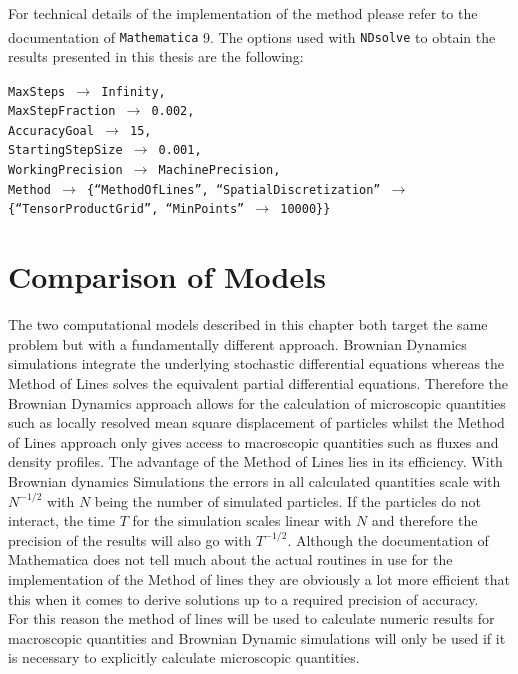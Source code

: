 For technical details of the implementation of the method please refer to the documentation of {\tt Mathematica} 9\textsuperscript{\textregistered}. The options used with {\tt NDsolve} to obtain the results presented in this thesis are the following:\par
{\tt    MaxSteps $\rightarrow$ Infinity,  \\
        MaxStepFraction $\rightarrow$ 0.002, \\
        AccuracyGoal $\rightarrow$ 15,  \\
        StartingStepSize $\rightarrow$ 0.001, \\
        WorkingPrecision $\rightarrow$ MachinePrecision, \\
        Method $\rightarrow$ \{``MethodOfLines'', ``SpatialDiscretization'' $\rightarrow$ \{``TensorProductGrid'', ``MinPoints'' $\rightarrow$ 10000\}\}}

\section{Comparison of Models}
The two computational models described in this chapter both target the same problem but with a fundamentally different approach. Brownian Dynamics simulations integrate the underlying stochastic differential equations whereas the Method of Lines solves the equivalent partial differential equations. Therefore the Brownian Dynamics approach allows for the calculation of microscopic quantities such as locally resolved mean square displacement of particles whilst the Method of Lines approach only gives access to macroscopic quantities such as fluxes and density profiles. The advantage of the Method of Lines lies in its efficiency. With Brownian dynamics Simulations the errors in all calculated quantities scale with $N^{-1/2}$ with $N$ being the number of simulated particles. If the particles do not interact, the time $T$ for the simulation scales linear with $N$ and therefore the precision of the results will also go with $T^{-1/2}$. Although the documentation of Mathematica does not tell much about the actual routines in use for the implementation of the Method of lines they are obviously a lot more efficient that this when it comes to derive solutions up to a required precision of accuracy. \\
For this reason the method of lines will be used to calculate numeric results for macroscopic quantities and Brownian Dynamic simulations will only be used if it is necessary to explicitly calculate microscopic quantities.

